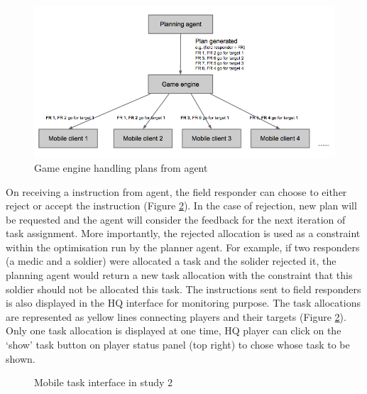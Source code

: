\begin{figure}[h]
  \centering
  \includegraphics[width=1\textwidth]{img/study2/system/dealingwithplans}
  \caption{Game engine handling plans from agent}
  \label{fig:handlingplans}
\end{figure}

On receiving a instruction from agent, the field responder can choose to either reject or accept the instruction (Figure \ref{fig:study2mobiletask}). In the case of rejection, new plan will be requested and the agent will consider the feedback for the next iteration of task assignment. More importantly, the rejected allocation is used as a constraint within the optimisation run by the planner agent. For example, if two responders (a medic and a soldier) were allocated a task and the solider rejected it, the planning agent would return a new task allocation with the constraint that this soldier should not be allocated this task. The instructions sent to field responders is also displayed in the HQ interface for monitoring purpose. The task allocations are represented as yellow lines connecting players and their targets (Figure \ref{fig:study2mobiletask}). Only one task allocation is displayed at one time, HQ player can click on the `show' task button on player status panel (top right) to chose whose task to be shown.  \\

\begin{figure}[h]
  \centering
  \caption{Mobile task interface in study 2}
  \label{fig:study2mobiletask}
\end{figure}

